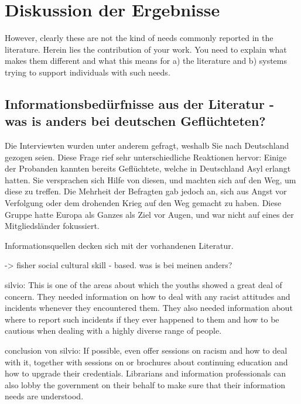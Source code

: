 \section{Diskussion der Ergebnisse}

However, clearly these are not the kind of needs commonly reported in the literature. Herein lies the contribution of your work. You need to explain what makes them different and what this means for a) the literature and b) systems trying to support individuals with such needs.


\subsection{Informationsbedürfnisse aus der Literatur - was is anders bei deutschen Geflüchteten?}

Die Interviewten wurden unter anderem gefragt, weshalb Sie nach Deutschland gezogen seien. Diese Frage rief sehr unterschiedliche Reaktionen hervor:\newline
Einige der Probanden kannten bereits Geflüchtete, welche in Deutschland Asyl erlangt hatten. Sie versprachen sich Hilfe von diesen, und machten sich auf den Weg, um diese zu treffen.\newline
Die Mehrheit der Befragten gab jedoch an, sich aus Angst vor Verfolgung oder dem drohenden Krieg auf den Weg gemacht zu haben. Diese Gruppe hatte Europa als Ganzes als Ziel vor Augen, und war nicht auf eines der Mitgliedsländer fokussiert.\newline


Informationsquellen decken sich mit der vorhandenen Literatur. \cite{oduntan2017investigating} \cite{mykyttschak2018}

-> fisher social cultural skill - based. was is bei meinen anders?

silvio:\cite{hakim2006information}
This is one of the areas about which the youths showed a great deal of concern. They
needed information on how to deal with any racist attitudes and incidents whenever
they encountered them. They also needed information about where to report such
incidents if they ever happened to them and how to be cautious when dealing with a
highly diverse range of people.

conclusion von silvio:
 If possible, even offer sessions on racism and how to deal with it, together with sessions on or brochures about continuing education and how to upgrade their credentials. Librarians and information professionals can also lobby the government on their behalf to make sure that their information needs are understood.


